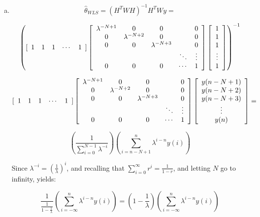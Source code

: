 \documentclass{article}
\begin{document}
\begin{enumerate}[(a)]
\vspace{15pt}

\item

\[
\hat\theta_{WLS} = (H^T W H)^{-1} H^T W y =
\]

\[
\left( [\begin{array}{c c c c c}
1 & 1 & 1 & \cdots & 1
\end{array}]
\left[ \begin{array}{c c c c c}
\lambda^{-N+1} & 0 & 0 & & 0 \\
0 & \lambda^{-N+2} & 0 & & 0 \\
0 & 0 & \lambda^{-N+3} & & 0\\
& & & \ddots & \vdots \\
0 & 0 & 0 & \cdots & 1\\
\end{array} \right]
\left[ \begin{array}{c}
1\\
1\\
1\\
\vdots\\
1\\
\end{array}\right] \right)^{-1}
\]

\[
[\begin{array}{c c c c c}
1 & 1 & 1 & \cdots & 1
\end{array}]
\left[ \begin{array}{c c c c c}
\lambda^{-N+1} & 0 & 0 & & 0 \\
0 & \lambda^{-N+2} & 0 & & 0 \\
0 & 0 & \lambda^{-N+3} & & 0\\
& & & \ddots & \vdots \\
0 & 0 & 0 & \cdots & 1\\
\end{array} \right]
\left[ \begin{array}{c}
y(n-N+1)\\
y(n-N+2)\\
y(n-N+3)\\
\vdots\\
y(n)\\
\end{array}\right] =
\]

\[
\left( \frac{1}{\sum_{i=0}^{N-1} \lambda^{-i}} \right)
\left( \sum_{i=n-N+1}^n \lambda^{i-n}y(i) \right)
\]

\vspace{6pt}

Since $\lambda^{-i} = (\frac{1}{\lambda})^i$, and recalling that
$\sum_{i=0}^{\infty} r^i = \frac{1}{1-r}$, and letting $N$ go to infinity,
yields:

\[
\frac{1}{\frac{1}{1-\frac{1}{\lambda}}}\left( \sum_{i=-\infty}^n
\lambda^{i-n}y(i) \right) = \left( 1-\frac{1}{\lambda} \right)
\left( \sum_{i=-\infty}^n \lambda^{i-n}y(i) \right)
\]

\end{enumerate}
\end{document}

